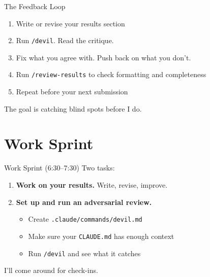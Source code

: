\begin{frame}{The Feedback Loop}
  \begin{enumerate}
    \item Write or revise your results section
    \item Run \texttt{/devil}. Read the critique.
    \item Fix what you agree with. Push back on what you don't.
    \item Run \texttt{/review-results} to check formatting and completeness
    \item Repeat before your next submission
  \end{enumerate}

  \vspace{6pt}

  The goal is catching blind spots before I do.
\end{frame}

\section{Work Sprint}

\begin{frame}{Work Sprint (6:30--7:30)}
  Two tasks:

  \vspace{6pt}

  \begin{enumerate}
    \item \textbf{Work on your results.} Write, revise, improve.

    \vspace{4pt}

    \item \textbf{Set up and run an adversarial review.}
      \begin{itemize}
        \item Create \texttt{.claude/commands/devil.md}
        \item Make sure your \texttt{CLAUDE.md} has enough context
        \item Run \texttt{/devil} and see what it catches
      \end{itemize}
  \end{enumerate}

  \vspace{6pt}

  I'll come around for check-ins.
\end{frame}

